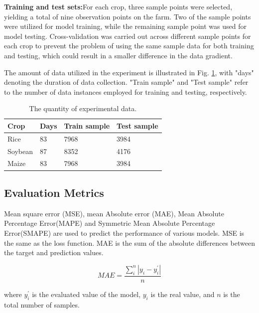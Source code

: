 \documentclass[acmsmall,manuscript, screen, review]{acmart}
\begin{document}
\textbf{Training and test sets:}For each crop, three sample points were selected, yielding a total of nine observation points on the farm. Two of the sample points were utilized for model training, while the remaining sample point was used for model testing. Cross-validation was carried out across different sample points for each crop to prevent the problem of using the same sample data for both training and testing, which could result in a smaller difference in the data gradient.

The amount of data utilized in the experiment is illustrated in Fig. \ref{dataset_size}, with "days" denoting the duration of data collection. "Train sample" and "Test sample" refer to the number of data instances employed for training and testing, respectively.


\begin{table}[htbp]
  \centering
  \caption{The quantity of experimental data.}
    \begin{tabular}{llll}
    \toprule
    Crop  & Days & Train sample & Test sample \\
    \midrule
    Rice  & 83    & 7968  & 3984 \\
    Soybean & 87    & 8352  & 4176 \\
    Maize & 83    & 7968  & 3984 \\
    \bottomrule
    \end{tabular}%
  \label{dataset_size}%
\end{table}%


\subsection{Evaluation Metrics}
Mean square error (MSE), mean Absolute error (MAE), Mean Absolute Percentage Error(MAPE) and Symmetric Mean Absolute Percentage Error(SMAPE) are used to predict the performance of various models. MSE is the same as the loss function. MAE is the sum of the absolute differences between the target and prediction values.


\begin{equation}
  MAE=\frac{\sum_{i}^{n}\left|y_i-y_i^\prime\right|}{n} \label{mae}
\end{equation}

where \begin{math}
  y_i^\prime
\end{math} is the evaluated value of the model, \begin{math}
  y_i
\end{math} is the real value, and \begin{math}
  n
\end{math} is the total number of samples.
\end{document}
